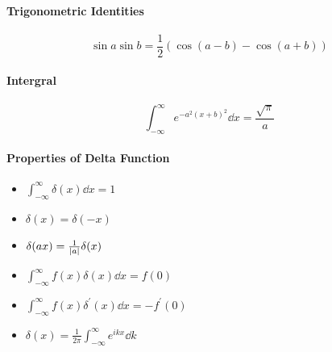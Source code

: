 \documentclass[a4paper,10pt]{article}
\begin{document}
\paragraph{Trigonometric Identities}
$$\sin a\sin b= \frac{1}{2}(\cos(a-b)-\cos(a+b))$$
\paragraph{Intergral}
$$\int_{-\infty}^{\infty}e^{-a^2(x+b)^2}\dd{x}=\frac{\sqrt{\pi}}{a}$$
\paragraph{Properties of Delta Function}
\begin{itemize}
    \item $\int_{-\infty}^{\infty}\delta(x)\dd{x}=1$
    \item $\delta(x)=\delta(-x)$
    \item $\delta(ax)=\frac{1}{\abs{a}}\delta(x)$
    \item $\int_{-\infty}^{\infty}f(x)\delta(x)\dd{x}=f(0)$
    \item $\int_{-\infty}^{\infty}f(x)\delta^\prime(x)\dd{x}=-f^\prime(0)$
    \item $\delta(x)=\frac{1}{2\pi}\int_{-\infty}^{\infty}e^{ikx}\dd{k}$
\end{itemize}
\end{document}
